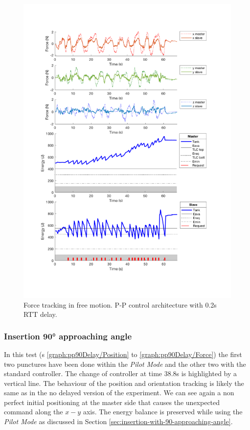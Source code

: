 \begin{center}
	\begin{figure}
		\includegraphics[width=\textwidth, keepaspectratio]{plots/ppDelay/Force.pdf}
		\caption{Force tracking in free motion. P-P control architecture with 0.2s RTT delay.}
		\label{graph:ppFreeDelay/Force}
	\end{figure}
\end{center}
\newpage
\subsubsection{Insertion 90° approaching angle}
In this test  (\figurename s{ \ref{graph:pp90Delay/Position} to \ref{graph:pp90Delay/Force}}) the first two punctures have been done within the \textit{Pilot Mode} and the other two with the standard controller.
The change of controller at time 38.8s is highlighted by a vertical line.
The behaviour of the position and orientation tracking is likely the same as in the no delayed version of the experiment. We can see again a non perfect initial positioning at the master side that causes the unexpected command along the $x-y$ axis.
The energy balance is preserved while using the \textit{Pilot Mode} as discussed in Section \ref{sec:insertion-with-90-approaching-angle}.

